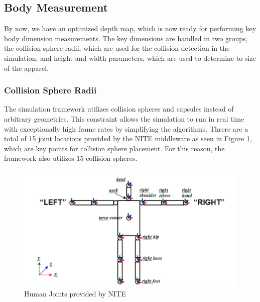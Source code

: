 \documentclass[twocolumn]{svjour3}          %
\begin{document}
\subsection{Body Measurement}
\label{subsec:3.2} 

By now, we have an optimized depth map, which is now ready for performing key body dimension measurements. The key dimensions are handled in two groups, the collision sphere radii, which are used for the collision detection in the simulation; and height and width parameters, which are used to determine to size of the apparel. 

\subsubsection{Collision Sphere Radii}

The simulation framework utilizes collision spheres and capsules instead of arbitrary geometries. This constraint allows the simulation to run in real time with exceptionally high frame rates by simplifying the algorithms. Threre are a total of 15 joint locations provided by the NITE middleware as seen in Figure \ref{fig:nite_joints}, which are key points for collision sphere placement. For this reason, the framework also utilizes 15 collision spheres.

\begin{figure}
	\begin{center}
			\includegraphics[width=0.9\columnwidth]{./figures/nite_joints.png}
	\end{center}
	\caption{Human Joints provided by NITE \cite{PS2102}}
	\label{fig:nite_joints}
\end{figure}
\end{document}
